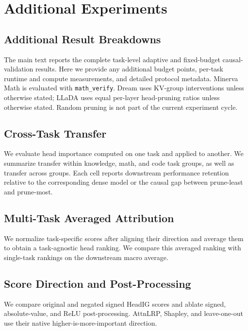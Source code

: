 \section{Additional Experiments}
\label{app:experiments}

\subsection{Additional Result Breakdowns}
\label{app:additional_results}

The main text reports the complete task-level adaptive and fixed-budget causal-validation results. Here we provide any additional budget points, per-task runtime and compute measurements, and detailed protocol metadata. Minerva Math is evaluated with \texttt{math\_verify}. Dream uses KV-group interventions unless otherwise stated; LLaDA uses equal per-layer head-pruning ratios unless otherwise stated. Random pruning is not part of the current experiment cycle.

\subsection{Cross-Task Transfer}
\label{app:cross_task}

We evaluate head importance computed on one task and applied to another. We summarize transfer within knowledge, math, and code task groups, as well as transfer across groups. Each cell reports downstream performance retention relative to the corresponding dense model or the causal gap between prune-least and prune-most.

\subsection{Multi-Task Averaged Attribution}
\label{app:average_attribution}

We normalize task-specific scores after aligning their direction and average them to obtain a task-agnostic head ranking. We compare this averaged ranking with single-task rankings on the downstream macro average.

\subsection{Score Direction and Post-Processing}
\label{app:score_direction}

We compare original and negated signed HeadIG scores and ablate signed, absolute-value, and ReLU post-processing. AttnLRP, Shapley, and leave-one-out use their native higher-is-more-important direction.

